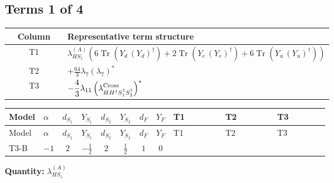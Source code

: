 \documentclass[8pt]{article}
\begin{document}
\begin{landscape}
\subsection*{Terms 1 of 4}
\begin{center}
\begin{tabular}{@{}c >{\raggedright\arraybackslash}p{0.82\linewidth}@{}}
\toprule
Column & Representative term structure \\
\midrule
T1 & \(\displaystyle {\lambda_{HS_1}^{(A)}} (6 \operatorname{Tr}\!\left({Y_d}\,\left({Y_d}\right)^{\dagger}\right)+2 \operatorname{Tr}\!\left({Y_e}\,\left({Y_e}\right)^{\dagger}\right)+6 \operatorname{Tr}\!\left({Y_u}\,\left({Y_u}\right)^{\dagger}\right))\) \\
\midrule
T2 & \(\displaystyle +\frac{64}{3} {\lambda_7} \left({\lambda_7}\right)^{*}\) \\
\midrule
T3 & \(\displaystyle -\frac{4}{3} {\lambda_{11}} \left({\lambda_{H H^\dagger S_1^\dagger S_2^\dagger}^{\rm Cross}}\right)^{*}\) \\
\midrule
\bottomrule
\end{tabular}
\end{center}
\smallskip
\tiny
\begin{longtable}{@{}llcccccc >{\raggedright\arraybackslash}p{0.21\linewidth} >{\raggedright\arraybackslash}p{0.21\linewidth} >{\raggedright\arraybackslash}p{0.21\linewidth}@{}}
\toprule
Model & $\alpha$ & $d_{S_1}$ & $Y_{S_1}$ & $d_{S_2}$ & $Y_{S_2}$ & $d_F$ & $Y_F$ & T1 & T2 & T3 \\
\midrule
\endfirsthead
\toprule
Model & $\alpha$ & $d_{S_1}$ & $Y_{S_1}$ & $d_{S_2}$ & $Y_{S_2}$ & $d_F$ & $Y_F$ & T1 & T2 & T3 \\
\midrule
\endhead
T3-B & $-1$ & $2$ & $-\frac{1}{2}$ & $2$ & $\frac{1}{2}$ & $1$ & $0$ & \scriptsize\adjustbox{max width=\linewidth}{$\begin{gathered} {\lambda_{HS_1}^{(A)}} (6 \operatorname{Tr}\!\left({Y_d}\,\left({Y_d}\right)^{\dagger}\right)+2 \operatorname{Tr}\!\left({Y_e}\,\left({Y_e}\right)^{\dagger}\right)+6 \operatorname{Tr}\!\left({Y_u}\,\left({Y_u}\right)^{\dagger}\right))\end{gathered}$} & \scriptsize\adjustbox{max width=\linewidth}{$\begin{gathered} +\frac{64}{3} {\lambda_7} \left({\lambda_7}\right)^{*}\end{gathered}$} & \scriptsize\adjustbox{max width=\linewidth}{$\begin{gathered} -\frac{4}{3} {\lambda_{11}} \left({\lambda_{H H^\dagger S_1^\dagger S_2^\dagger}^{\rm Cross}}\right)^{*}\end{gathered}$} \\
\midrule
\bottomrule
\end{longtable}
\clearpage
\noindent\textbf{Quantity: }$\lambda_{HS_1}^{(A)}$\par\smallskip

\end{landscape}
\end{document}
